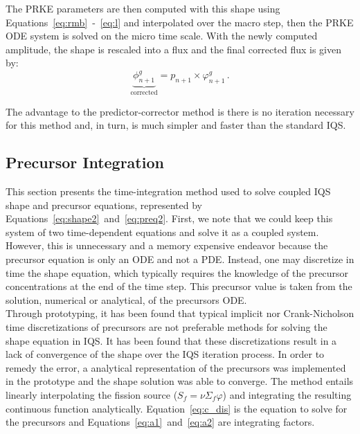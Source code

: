 \documentclass[12pt]{scrartcl}
\newcommand{\eqt}[1]{Equation~\ref{#1}}                     %
\newcommand{\be}{\begin{equation}}
\newcommand{\ee}{\end{equation}}
\begin{document}
The PRKE parameters are then computed with this shape using Equations~\ref{eq:rmb}~-~\ref{eq:l} and interpolated over the macro step, then the PRKE ODE system is solved on the micro time scale.  With the newly computed amplitude, the shape is rescaled into a flux and the final corrected flux is given by:
\be
\underbrace{\phi^g_{n+1}}_{\text{corrected}} = p_{n+1} \times \varphi^g_{n+1} \,.
\ee

The advantage to the predictor-corrector method is there is no iteration necessary for this method and, in turn, is much simpler and faster than the standard IQS.  

\subsection{Precursor Integration}
\label{sect:prec}

This section presents the time-integration method used to solve coupled IQS shape and precursor equations, represented by Equations~\ref{eq:shape2}~and~\ref{eq:preq2}. First, we note that we could keep this system of two time-dependent equations and solve it as a coupled system. However, this is unnecessary and a memory expensive endeavor because the precursor equation is only an ODE and not a PDE. Instead, one may discretize in time the shape equation, which typically requires the knowledge of the precursor concentrations at the end of the time step. This precursor value is taken from the solution, numerical or analytical, of the precursors ODE.  \\

Through prototyping, it has been found that typical implicit nor Crank-Nicholson time discretizations of precursors are not preferable methods for solving the shape equation in IQS.  It has been found that these discretizations result in a lack of convergence of the shape over the IQS iteration process.  In order to remedy the error, a analytical representation of the precursors was implemented in the prototype and the shape solution was able to converge.  The method entails linearly interpolating the fission source ($S_f = \nu \Sigma_f \varphi$) and integrating the resulting continuous function analytically. \eqt{eq:c_dis} is the equation to solve for the precursors and Equations~\ref{eq:a1}~and~\ref{eq:a2} are integrating factors.
\end{document}
